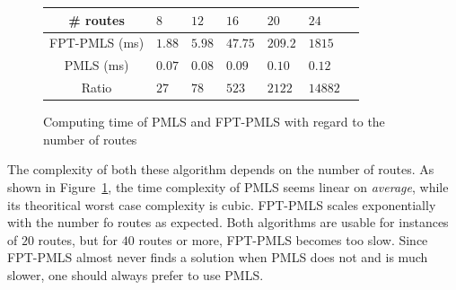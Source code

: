 \documentclass[10pt, conference, letterpaper]{IEEEtran}
\begin{document}
          \begin{figure}[h] 
       \begin{center}
   \begin{tabularx}{0.5\textwidth}{|c|X|X|X|X|X|X|}
    \hline
    \# routes& $8$ & $12$ & $16$& $20$ & $24$\\
    \hline
    FPT-PMLS (ms) & $1.88$ &$5.98$&$47.75$&$209.2$&$1815$\\
    \hline
     PMLS (ms) & $0.07$ &$0.08$&$0.09$&$0.10$&$0.12$\\
    \hline
 Ratio & $27$ &$78$&$523$&$2122$&$14882$\\
    \hline
      \end{tabularx}
      \end{center}
   \caption{Computing time of PMLS and FPT-PMLS with regard to the number of routes}
        \label{fig:tps_fpt}
     \end{figure}
    
  The complexity of both these algorithm depends on the number of routes. As shown in Figure~\ref{fig:tps_fpt}, the time complexity of PMLS seems linear on \emph{average}, while its theoritical worst case complexity is cubic. FPT-PMLS scales exponentially with the number fo routes as expected. Both algorithms are usable for instances of $20$ routes, but for $40$ routes or more,  FPT-PMLS becomes too slow. Since FPT-PMLS almost never finds a solution when PMLS does not and is much slower, one should always prefer to use PMLS. 
  
%     
%
%     
\end{document}
